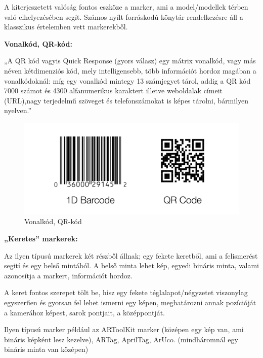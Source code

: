 


A kiterjeszetett valóság fontos eszköze a marker, ami a model/modellek térben való elhelyezésében segít. Számos nyílt forráskodú könytár rendelkezésre áll a klasszikus értelemben vett markerekből.

{\bf Vonalkód, QR-kód:}

„A  QR  kód vagyis Quick  Response  (gyors  válasz) egy  mátrix  vonalkód,  vagy  más  néven kétdimenziós kód, mely intelligensebb, több információt hordoz magában a vonalkódoknál: míg egy vonalkód mintegy 13 számjegyet tárol, addig a QR kód 7000 számot és 4300 alfanumerikus karaktert illetve weboldalak címeit (URL),nagy terjedelmű szöveget és telefonszámokat is képes tárolni, bármilyen nyelven.”

\begin{figure}[htp]
    \centering
   	\includegraphics[width=4.8truecm, height=2truecm]{images/qr_bar.png}
	\caption{Vonalkód, QR-kód}
\end{figure}

{\bf „Keretes” markerek:}

Az ilyen típusú markerek két részből állnak; egy fekete keretből, ami a felismerést segití és egy belső mintából. A belső minta lehet kép, egyedi bináris minta, valami azonosítja a markert, információt hordoz.

A keret fontos szerepet tölt be, hisz egy fekete téglalapot/négyzetet viszonylag egyszerűen és gyorsan fel lehet ismerni egy képen, meghatározni annak pozícióját a kamerához képest, sarok pontjait, a középpontját.

Ilyen típusú marker például az ARToolKit marker (középen egy kép van, ami bináris képként lesz kezelve), ARTag, AprilTag, ArUco. (mindháromnál egy bináris minta van középen)

